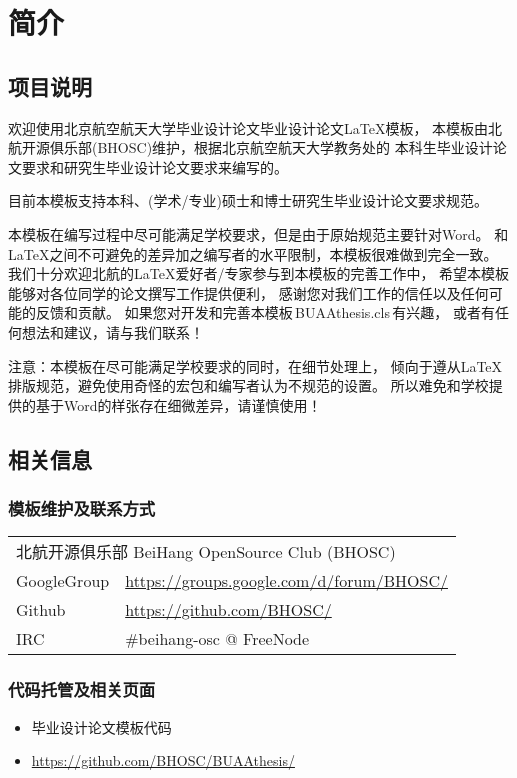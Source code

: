 \chapter{简介}

\section{项目说明}

欢迎使用北京航空航天大学毕业设计论文毕业设计论文\LaTeX{}模板，
本模板由北航开源俱乐部(BHOSC)维护，根据北京航空航天大学教务处的
本科生毕业设计论文要求和研究生毕业设计论文要求来编写的。

目前本模板支持本科、(学术/专业)硕士和博士研究生毕业设计论文要求规范。

本模板在编写过程中尽可能满足学校要求，但是由于原始规范主要针对Word。
和\LaTeX{}之间不可避免的差异加之编写者的水平限制，本模板很难做到完全一致。
我们十分欢迎北航的\LaTeX{}爱好者/专家参与到本模板的完善工作中，
希望本模板能够对各位同学的论文撰写工作提供便利，
感谢您对我们工作的信任以及任何可能的反馈和贡献。
如果您对开发和完善本模板\,BUAAthesis.cls\,有兴趣，
或者有任何想法和建议，请与我们联系！

{\heiti 注意：}本模板在尽可能满足学校要求的同时，在细节处理上，
倾向于遵从\LaTeX{}排版规范，避免使用奇怪的宏包和编写者认为不规范的设置。
所以难免和学校提供的基于Word的样张存在细微差异，请谨慎使用！

\section{相关信息}

\subsection{模板维护及联系方式}
\begin{tabular}{ll}
    \multicolumn{2}{l}{北航开源俱乐部 BeiHang OpenSource Club (BHOSC)} \\
    GoogleGroup & \url{https://groups.google.com/d/forum/BHOSC/} \\
    Github      & \url{https://github.com/BHOSC/} \\
    IRC         & \#beihang-osc @ FreeNode
\end{tabular}

\subsection{代码托管及相关页面}
\begin{itemize}
    \item 毕业设计论文模板代码
    \item[] \url{https://github.com/BHOSC/BUAAthesis/}
\end{itemize}

